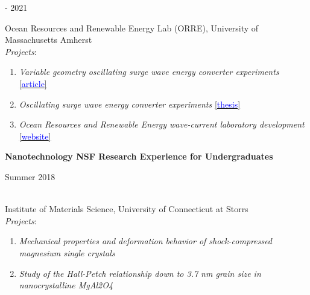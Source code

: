 \documentclass[letterpaper,11pt]{article}
\begin{document}
    \hfill
    \begin{minipage}[t]{.20\textwidth}
     - 2021\\
\end{minipage}
Ocean Resources and Renewable Energy Lab (ORRE), University of Massachusetts Amherst\\
\textit{Projects}:
\begin{enumerate}[topsep=2pt,itemsep=-1ex,partopsep=1ex,parsep=1.25ex]
  \item \textit{Variable geometry oscillating surge wave energy converter experiments} \href{https://www.nrel.gov/news/program/2022/future-of-wave-energy.html}{[\textcolor{blue}{article}]}
  \item \textit{Oscillating surge wave energy converter experiments} \href{https://doi.org/10.7275/24512253.0}{[\textcolor{blue}{thesis}]}
  \item \textit{Ocean Resources and Renewable Energy wave-current laboratory development} \href{https://teamer-us.org/product/university-of-massachusetts-amherst-orre-wave-current-flume/}{[\textcolor{blue}{website}]}
\end{enumerate}
%
%
\begin{minipage}[t]{.70\textwidth}
    \flushleft
    \textbf{Nanotechnology NSF Research Experience for Undergraduates}\\
    \end{minipage}
    \hfill
    \begin{minipage}[t]{.20\textwidth}
    \flushright
    Summer 2018\\
\end{minipage} \\
Institute of Materials Science, University of Connecticut at Storrs\\

\textit{Projects}:
\vspace{-7pt}
     \begin{enumerate}
            \item \textit{Mechanical properties and deformation behavior of shock-compressed magnesium single crystals}
            \vspace{-7pt}
            \item \textit{Study of the Hall-Petch relationship down to 3.7 nm grain size in nanocrystalline MgAl2O4}
    \end{enumerate}
%
\end{document}

